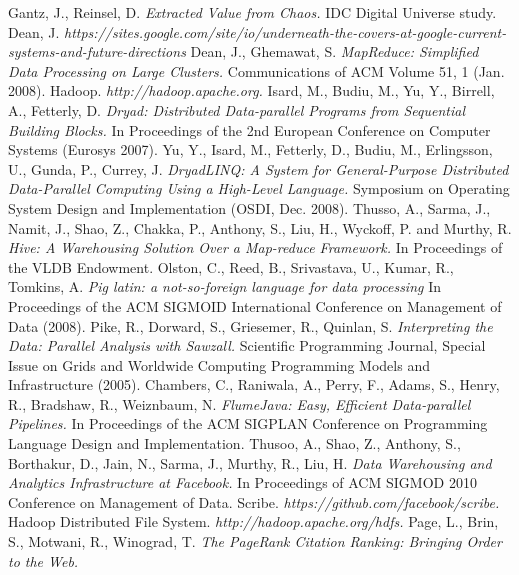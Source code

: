 \documentclass[11pt,a4paper,twoside]{report}
\begin{document}
\begin{thebibliography}{23}
 Gantz, J., Reinsel, D.
 {\em Extracted Value from Chaos.}
 IDC Digital Universe study.
 Dean, J.\newline
 {\em https://sites.google.com/site/io/underneath-the-covers-at-google-current-systems-and-future-directions}
 Dean, J., Ghemawat, S.
 {\em MapReduce: Simplified Data Processing on Large Clusters.}
 Communications of ACM Volume 51, 1 (Jan. 2008).
 Hadoop.
 {\em http://hadoop.apache.org.}
 Isard, M., Budiu, M., Yu, Y., Birrell, A., Fetterly, D.
 {\em Dryad: Distributed Data-parallel Programs from Sequential Building
 Blocks.}
 In Proceedings of the 2nd European Conference on Computer Systems
 (Eurosys 2007).
 Yu, Y., Isard, M., Fetterly, D., Budiu, M., Erlingsson, U., Gunda, P.,
 Currey, J.
 {\em DryadLINQ: A System for General-Purpose Distributed Data-Parallel
 Computing Using a High-Level Language.}
 Symposium on Operating System Design and Implementation (OSDI, Dec. 2008).
 Thusso, A., Sarma, J., Namit, J., Shao, Z., Chakka, P., Anthony, S., Liu, H.,
 Wyckoff, P. and Murthy, R.
 {\em Hive: A Warehousing Solution Over a Map-reduce Framework.}
 In Proceedings of the VLDB Endowment.
 Olston, C., Reed, B., Srivastava, U., Kumar, R., Tomkins, A.
 {\em Pig latin: a not-so-foreign language for data processing}
 In Proceedings of the ACM SIGMOID International Conference on Management of
 Data (2008).
 Pike, R., Dorward, S., Griesemer, R., Quinlan, S.
 {\em Interpreting the Data: Parallel Analysis with Sawzall.}
 Scientific Programming Journal, Special Issue on Grids and Worldwide Computing
 Programming Models and Infrastructure (2005).
 Chambers, C., Raniwala, A., Perry, F., Adams, S., Henry, R., Bradshaw, R.,
 Weiznbaum, N.
 {\em FlumeJava: Easy, Efficient Data-parallel Pipelines.}
 In Proceedings of the ACM SIGPLAN Conference on Programming Language Design and
 Implementation.
 Thusoo, A., Shao, Z., Anthony, S., Borthakur, D., Jain, N., Sarma, J.,
 Murthy, R., Liu, H.
 {\em Data Warehousing and Analytics Infrastructure at Facebook.}
 In Proceedings of ACM SIGMOD 2010 Conference on Management of Data.
 Scribe.
 {\em https://github.com/facebook/scribe.}
 Hadoop Distributed File System.
 {\em http://hadoop.apache.org/hdfs.}
 Page, L., Brin, S., Motwani, R., Winograd, T.
 {\em The PageRank Citation Ranking: Bringing Order to the Web.}

\end{thebibliography}
\end{document}
